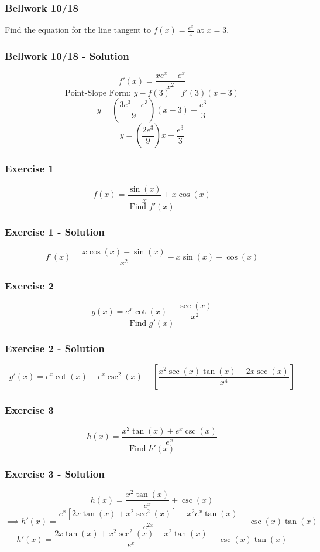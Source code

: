 \documentclass[12pt]{beamer}
\begin{document}
\begin{frame}
	\frametitle{Bellwork 10/18}
	\initclock

	\vfill
	\vfill
	\vfill
	\vfill
	\vfill
	\Large
	Find the equation for the line tangent to $f(x)=\frac{e^x}{x}$ at $x = 3$.
	\vfill
	\vfill
	\vfill
	\vfill
	\vfill
	\vfill
	\vfill
	\vfill

	\small
	\crono
\end{frame}
\begin{frame}
	\frametitle{Bellwork 10/18 - Solution}

	\vfill
	\vfill
	\vfill
	\vfill
	\vfill
	\vfill
	\Large
	\[f'(x)=\frac{xe^x-e^x}{x^2}\]
	\vfill
	\large
	\[\text{Point-Slope Form: }y-f(3)=f'(3)(x-3)\]
	\[y=\left(\frac{3e^3-e^3}{9}\right)(x-3)+\frac{e^3}{3}\]
	\[\boxed{y=\left(\frac{2e^3}{9}\right)x-\frac{e^3}{3}}\]
\end{frame}
\begin{frame}
	\frametitle{Exercise 1}

	\Large
	\[f(x)=\frac{\sin(x)}{x}+x\cos(x)\]
	\vfill
	\[\text{Find }f'(x)\]
\end{frame}
\begin{frame}
	\frametitle{Exercise 1 - Solution}

	\Large
	\[f'(x)=\boxed{\frac{x\cos(x)-\sin(x)}{x^2}-x\sin(x)+\cos(x)}\]
\end{frame}
\begin{frame}
	\frametitle{Exercise 2}

	\Large
	\[g(x)=e^x\cot(x)-\frac{\sec(x)}{x^2}\]
	\vfill
	\[\text{Find }g'(x)\]
\end{frame}
\begin{frame}
	\frametitle{Exercise 2 - Solution}

	\[g'(x)=\boxed{e^x\cot(x)-e^x\csc^2(x)-\left[\frac{x^2\sec(x)\tan(x)-2x\sec(x)}{x^4}\right]}\]
\end{frame}
\begin{frame}
	\frametitle{Exercise 3}

	\Large
	\[h(x)=\frac{x^2\tan(x)+e^x\csc(x)}{e^x}\]
	\vfill
	\[\text{Find }h'(x)\]
\end{frame}
\begin{frame}
	\frametitle{Exercise 3 - Solution}

	\large
	\[h(x)=\frac{x^2\tan(x)}{e^x}+\csc(x)\]
	\vfill
	\small
	\[\implies h'(x)=\frac{e^x[2x\tan(x)+x^2\sec^2(x)]-x^2e^x\tan(x)}{e^{2x}}-\csc(x)\tan(x)\]
	\[h'(x)=\boxed{\frac{2x\tan(x)+x^2\sec^2(x)-x^2\tan(x)}{e^x}-\csc(x)\tan(x)}\]
\end{frame}
\end{document}
